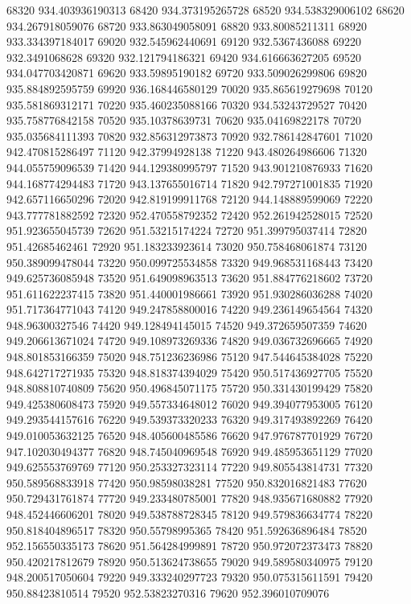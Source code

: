 {68320 934.403936190313
68420 934.373195265728
68520 934.538329006102
68620 934.267918059076
68720 933.863049058091
68820 933.80085211311
68920 933.334397184017
69020 932.545962440691
69120 932.5367436088
69220 932.3491068628
69320 932.121794186321
69420 934.616663627205
69520 934.047703420871
69620 933.59895190182
69720 933.509026299806
69820 935.884892595759
69920 936.168446580129
70020 935.865619279698
70120 935.581869312171
70220 935.460235088166
70320 934.53243729527
70420 935.758776842158
70520 935.10378639731
70620 935.04169822178
70720 935.035684111393
70820 932.856312973873
70920 932.786142847601
71020 942.470815286497
71120 942.37994928138
71220 943.480264986606
71320 944.055759096539
71420 944.129380995797
71520 943.901210876933
71620 944.168774294483
71720 943.137655016714
71820 942.797271001835
71920 942.657116650296
72020 942.819199911768
72120 944.148889599069
72220 943.777781882592
72320 952.470558792352
72420 952.261942528015
72520 951.923655045739
72620 951.53215174224
72720 951.399795037414
72820 951.42685462461
72920 951.183233923614
73020 950.758468061874
73120 950.389099478044
73220 950.099725534858
73320 949.968531168443
73420 949.625736085948
73520 951.649098963513
73620 951.884776218602
73720 951.611622237415
73820 951.440001986661
73920 951.930286036288
74020 951.717364771043
74120 949.247858800016
74220 949.236149654564
74320 948.96300327546
74420 949.128494145015
74520 949.372659507359
74620 949.206613671024
74720 949.108973269336
74820 949.036732696665
74920 948.801853166359
75020 948.751236236986
75120 947.544645384028
75220 948.642717271935
75320 948.818374394029
75420 950.517436927705
75520 948.808810740809
75620 950.496845071175
75720 950.331430199429
75820 949.425380608473
75920 949.557334648012
76020 949.394077953005
76120 949.293544157616
76220 949.539373320233
76320 949.317493892269
76420 949.010053632125
76520 948.405600485586
76620 947.976787701929
76720 947.102030494377
76820 948.745040969548
76920 949.485953651129
77020 949.625553769769
77120 950.253327323114
77220 949.805543814731
77320 950.589568833918
77420 950.98598038281
77520 950.832016821483
77620 950.729431761874
77720 949.233480785001
77820 948.935671680882
77920 948.452446606201
78020 949.538788728345
78120 949.579836634774
78220 950.818404896517
78320 950.55798995365
78420 951.592636896484
78520 952.156550335173
78620 951.564284999891
78720 950.972072373473
78820 950.420217812679
78920 950.513624738655
79020 949.589580340975
79120 948.200517050604
79220 949.333240297723
79320 950.075315611591
79420 950.88423810514
79520 952.53823270316
79620 952.396010709076
}

